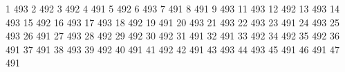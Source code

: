 1	493
2	492
3	492
4	491
5	492
6	493
7	491
8	491
9	493
11	493
12	492
13	493
14	493
15	492
16	493
17	493
18	492
19	491
20	493
21	493
22	493
23	491
24	493
25	493
26	491
27	493
28	492
29	492
30	492
31	491
32	491
33	492
34	492
35	492
36	491
37	491
38	493
39	492
40	491
41	492
42	491
43	493
44	493
45	491
46	491
47	491